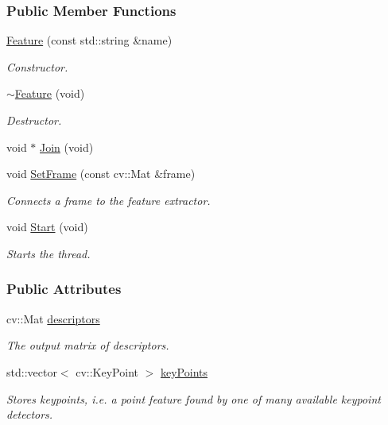 \subsubsection*{Public Member Functions}
\begin{DoxyCompactItemize}
\item 
\hyperlink{group___feature_extractor_a020e991990bb6ca904015ffa7902d55f}{Feature} (const std\-::string \&name)
\begin{DoxyCompactList}\small\item\em Constructor. \end{DoxyCompactList}\item 
\hyperlink{group___feature_extractor_ab6dfcfe22cc71c7b45a61d991b4ff775}{$\sim$\-Feature} (void)
\begin{DoxyCompactList}\small\item\em Destructor. \end{DoxyCompactList}\item 
void $\ast$ \hyperlink{group___core_a8f33f7750321d5df9188033e7e3e300d}{Join} (void)
\item 
void \hyperlink{group___feature_extractor_af261b9c5cac5ff1fb628317c7009c845}{Set\-Frame} (const cv\-::\-Mat \&frame)
\begin{DoxyCompactList}\small\item\em Connects a frame to the feature extractor. \end{DoxyCompactList}\item 
void \hyperlink{group___core_a2b42f82341afd2747ea093b6ac8b91cb}{Start} (void)
\begin{DoxyCompactList}\small\item\em Starts the thread. \end{DoxyCompactList}\end{DoxyCompactItemize}
\subsubsection*{Public Attributes}
\begin{DoxyCompactItemize}
\item 
cv\-::\-Mat \hyperlink{group___feature_extractor_a857c4955b0325d8b96c863d873bf8db5}{descriptors}
\begin{DoxyCompactList}\small\item\em The output matrix of descriptors. \end{DoxyCompactList}\item 
std\-::vector$<$ cv\-::\-Key\-Point $>$ \hyperlink{group___feature_extractor_ac666ae973c3840be1b3b9183dd12b8c1}{key\-Points}
\begin{DoxyCompactList}\small\item\em Stores keypoints, i.\-e. a point feature found by one of many available keypoint detectors. \end{DoxyCompactList}\end{DoxyCompactItemize}
